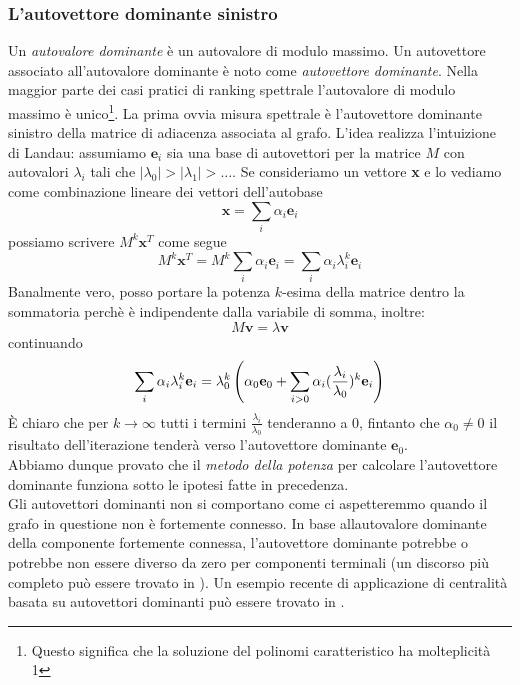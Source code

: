 \subsubsection{L'autovettore dominante sinistro}
Un \textit{autovalore dominante} è un autovalore di modulo massimo. Un autovettore associato all'autovalore dominante è noto come \textit{autovettore dominante}. Nella maggior parte dei casi pratici di ranking spettrale l'autovalore di modulo massimo è unico\footnote{Questo significa che la soluzione del polinomi caratteristico ha molteplicità 1}. La prima ovvia misura spettrale è l'autovettore dominante sinistro della matrice di adiacenza associata al grafo. L'idea realizza l'intuizione di Landau: assumiamo $\textbf{e}_i$ sia una base di autovettori per la matrice $M$ con autovalori $\lambda_i$ tali che $|\lambda_0| > |\lambda_1| > \dots$. Se consideriamo un vettore \textbf{x} e lo vediamo come combinazione lineare dei vettori dell'autobase
\begin{equation*}
    \textbf{x} = \sum_i{\alpha_i\textbf{e}_i}
\end{equation*}
possiamo scrivere $M^k\textbf{x}^T$ come segue
\begin{equation*}
    M^k\textbf{x}^T = M^k\sum_i{\alpha_i\textbf{e}_i} = \sum_i{\alpha_i \lambda_i^k \textbf{e}_i}
\end{equation*}
Banalmente vero, posso portare la potenza $k$-esima della matrice dentro la sommatoria perchè è indipendente dalla variabile di somma, inoltre:
\begin{equation*}
    M\textbf{v} = \lambda \textbf{v}
\end{equation*}
continuando
\begin{equation*}
    \sum_i{\alpha_i \lambda_i^k \textbf{e}_i} = \lambda_0^k\left(\alpha_0\textbf{e}_0 + \sum_{i > 0}{\alpha_i(\frac{\lambda_i}{\lambda_0})^k\textbf{e}_i}\right)
\end{equation*}
È chiaro che per $k \to \infty$ tutti i termini $\frac{\lambda_i}{\lambda_0}$ tenderanno a 0, fintanto che $\alpha_0 \neq 0$ il risultato dell'iterazione tenderà verso l'autovettore dominante $\textbf{e}_0$.\\
Abbiamo dunque provato che il \textit{metodo della potenza} per calcolare l'autovettore dominante funziona sotto le ipotesi fatte in precedenza.\\
Gli autovettori dominanti non si comportano come ci aspetteremmo quando il grafo in questione non è fortemente connesso. In base allautovalore dominante della componente fortemente connessa, l'autovettore dominante potrebbe o potrebbe non essere diverso da zero per componenti terminali (un discorso più completo può essere trovato in %
). Un esempio recente di applicazione di centralità basata su autovettori dominanti può essere trovato in %
.
